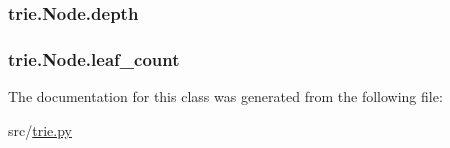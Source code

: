 \subsubsection[{\texorpdfstring{depth}{depth}}]{\setlength{\rightskip}{0pt plus 5cm}trie.\+Node.\+depth}\hypertarget{classtrie_1_1_node_a1312b7e67b6012b37960e0f4d1a0190c}{}\label{classtrie_1_1_node_a1312b7e67b6012b37960e0f4d1a0190c}
\subsubsection[{\texorpdfstring{leaf\+\_\+count}{leaf_count}}]{\setlength{\rightskip}{0pt plus 5cm}trie.\+Node.\+leaf\+\_\+count}\hypertarget{classtrie_1_1_node_a697c4a8b684efa32dd2128e0ba92098a}{}\label{classtrie_1_1_node_a697c4a8b684efa32dd2128e0ba92098a}


The documentation for this class was generated from the following file\+:\begin{DoxyCompactItemize}
\item 
src/\hyperlink{trie_8py}{trie.\+py}\end{DoxyCompactItemize}
